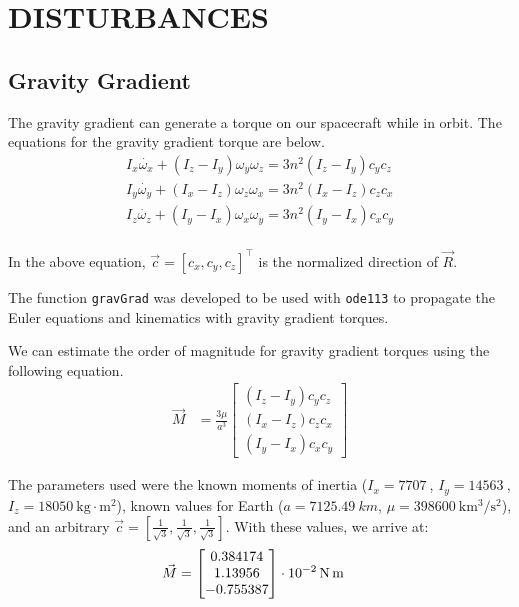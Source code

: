 \section{\Large DISTURBANCES}
\subsection{Gravity Gradient}

The gravity gradient can generate a torque on our spacecraft while in orbit. The equations for the gravity gradient torque are below.
\begin{align*}
    I_x \dot{\omega_x} + (I_z - I_y) \omega_y \omega_z = 3 n^2 (I_z - I_y) c_y c_z \\
    I_y \dot{\omega_y} + (I_x - I_z) \omega_z \omega_x = 3 n^2 (I_x - I_z) c_z c_x \\
    I_z \dot{\omega_z} + (I_y - I_x) \omega_x \omega_y = 3 n^2 (I_y - I_x) c_x c_y \\
\end{align*}

In the above equation, $\Vec{c} = [c_x, c_y, c_z]^\intercal$ is the normalized direction of $\Vec{R}$.

The function \texttt{gravGrad} was developed to be used with \texttt{ode113} to propagate the Euler equations and kinematics with gravity gradient torques.




We can estimate the order of magnitude for gravity gradient torques using the following equation.
\begin{align*}
    \Vec{M} &= \frac{3 \mu}{a^3}
    \begin{bmatrix}
    (I_z - I_y) c_y c_z \\
    (I_x - I_z) c_z c_x \\
    (I_y - I_x) c_x c_y
    \end{bmatrix}
\end{align*}

The parameters used were the known moments of inertia ($I_x = \qty{7707}{}$, $I_y = \qty{14563}{}$, $I_z = \qty{18050}{\kilogram\cdot\meter^2}$), known values for Earth ($a = \qty{7125.49}{km}$, $\mu = \qty{398600}{\km^3\per\second^2}$), and an arbitrary $\Vec{c} = [\frac{1}{\sqrt{3}}, \frac{1}{\sqrt{3}}, \frac{1}{\sqrt{3}}]$. With these values, we arrive at:
\begin{align*}
    \Vec{M} &=
\qty[parse-numbers = false]{
    \begin{bmatrix}
    0.384174 \\
    1.13956 \\
    -0.755387
    \end{bmatrix}
    \cdot
    10^{-2}
}{\newton\meter}
\end{align*}


